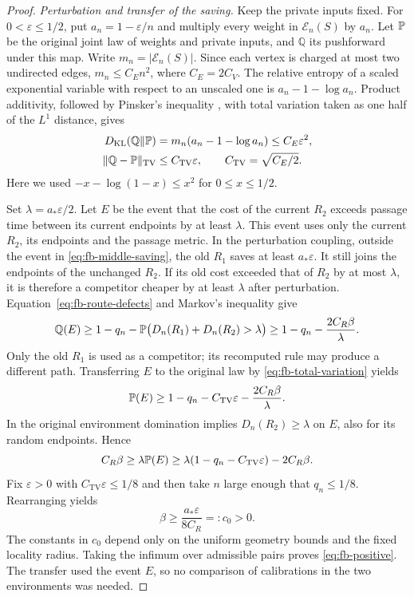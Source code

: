 \begin{proof}
\emph{Perturbation and transfer of the saving.}
Keep the private inputs fixed.  For $0<\varepsilon\le1/2$, put
$a_n=1-\varepsilon/n$ and multiply every weight in
$\mathcal E_n(S)$ by $a_n$.  Let $\mathbb P $ be the original joint
law of weights and private inputs, and $\mathbb Q$ its pushforward
under this map.  Write $m_n=|\mathcal E_n(S)|$.  Since each vertex
is charged at most two undirected edges,
$m_n\le C_E n^2$, where $C_E=2C_V$.  The relative entropy of a scaled
exponential variable with respect to an unscaled one is
$a_n-1-\log a_n$.  Product additivity, followed by Pinsker's
inequality \cite[Theorem~31, order one]{vanErvenHarremoes2014}, with total
variation taken as one half of the $L^1$ distance, gives
\begin{equation}
 \begin{split}
 D_{\mathrm{KL}}(\mathbb Q\Vert\mathbb P )
 &=m_n(a_n-1-\log a_n)\le C_E\varepsilon^2,\\
 \|\mathbb Q-\mathbb P \|_{\mathrm{TV}}
 &\le C_{\mathrm{TV}}\varepsilon,
 \qquad C_{\mathrm{TV}}=\sqrt{C_E/2}.
 \end{split}
 \label{eq:fb-total-variation}
\end{equation}
Here we used $-x-\log(1-x)\le x^2$ for $0\le x\le1/2$.

Set $\lambda=a_*\varepsilon/2$.  Let $E$ be the event that the cost
of the current $R_2$ exceeds passage time between its current endpoints
by at least $\lambda$.  This event uses only the current $R_2$, its
endpoints and the passage metric.  In the perturbation coupling,
outside the event in \eqref{eq:fb-middle-saving}, the old $R_1$ saves at least
$a_*\varepsilon$.  It still joins the endpoints of the unchanged
$R_2$.  If its old cost exceeded that of $R_2$ by at most $\lambda$,
it is therefore a competitor cheaper by at least $\lambda$ after
perturbation.  Equation~\eqref{eq:fb-route-defects} and Markov's
inequality give
\[
 \mathbb Q(E)
 \ge1-q_n-
 \mathbb P \bigl(D_n(R_1)+D_n(R_2)>\lambda\bigr)
 \ge1-q_n-\frac{2C_R\beta}{\lambda}.
\]
Only the old $R_1$ is used as a competitor; its recomputed rule may
produce a different path.  Transferring $E$ to the original law by
\eqref{eq:fb-total-variation} yields
\[
 \mathbb P (E)
 \ge1-q_n-C_{\mathrm{TV}}\varepsilon
       -\frac{2C_R\beta}{\lambda}.
\]
In the original environment domination implies
$D_n(R_2)\ge\lambda$ on $E$, also for its random endpoints.
Hence
\[
 C_R\beta\ge\lambda\mathbb P (E)
 \ge\lambda(1-q_n-C_{\mathrm{TV}}\varepsilon)-2C_R\beta.
\]
Fix $\varepsilon>0$ with $C_{\mathrm{TV}}\varepsilon\le1/8$ and
then take $n$ large enough that $q_n\le1/8$.  Rearranging yields
\[
 \beta\ge \frac{a_*\varepsilon}{8C_R}=:c_0>0.
\]
The constants in $c_0$ depend only on the uniform geometry bounds
and the fixed locality radius.  Taking the infimum over admissible
pairs proves \eqref{eq:fb-positive}.  The transfer used the event $E$,
so no comparison of calibrations in the two environments was needed.
\end{proof}

